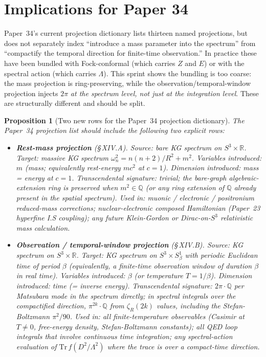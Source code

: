 \documentclass[11pt]{article}
\newtheorem{proposition}{Proposition}
\begin{document}
\section{Implications for Paper 34}
\label{sec:paper34}

Paper~34's current projection dictionary lists thirteen named
projections, but does not separately index ``introduce a mass parameter
into the spectrum'' from ``compactify the temporal direction for
finite-time observation.''  In practice these have been bundled with
Fock-conformal (which carries $Z$ and $E$) or with the spectral action
(which carries $\Lambda$).  This sprint shows the bundling is too
coarse: the mass projection is ring-preserving, while the
observation/temporal-window projection injects $2\pi$ \emph{at the
spectrum level, not just at the integration level}.  These are
structurally different and should be split.

\begin{proposition}[Two new rows for the Paper~34 projection dictionary]
\label{prop:two_rows}
The Paper~34 projection list should include the following two
explicit rows:

\begin{itemize}
\setlength\itemsep{0pt}
\item \textbf{Rest-mass projection} (\S\,XIV.A).
\textit{Source:} bare KG spectrum on $S^3 \times \mathbb{R}$.
\textit{Target:} massive KG spectrum
$\omega_n^2 = n(n+2)/R^2 + m^2$.
\textit{Variables introduced:} $m$ (mass; equivalently rest-energy
$mc^2$ at $c=1$).
\textit{Dimension introduced:} mass = energy at $c = 1$.
\textit{Transcendental signature:} \emph{trivial}; the bare-graph
algebraic-extension ring is preserved when $m^2 \in \mathbb{Q}$ (or any
ring extension of $\mathbb{Q}$ already present in the spatial
spectrum).
\textit{Used in:} muonic / electronic / positronium reduced-mass
corrections; nuclear-electronic composed Hamiltonian (Paper~23
hyperfine I.S coupling); any future Klein-Gordon or Dirac-on-$S^3$
relativistic mass calculation.

\item \textbf{Observation / temporal-window projection} (\S\,XIV.B).
\textit{Source:} KG spectrum on $S^3 \times \mathbb{R}$.
\textit{Target:} KG spectrum on $S^3 \times S^1_\beta$ with periodic
Euclidean time of period $\beta$ (equivalently, a finite-time
observation window of duration $\beta$ in real time).
\textit{Variables introduced:} $\beta$ (or temperature $T = 1/\beta$).
\textit{Dimension introduced:} time (= inverse energy).
\textit{Transcendental signature:} $2\pi \cdot \mathbb{Q}$ per
Matsubara mode in the spectrum directly; in spectral integrals over
the compactified direction, $\pi^{2k} \cdot \mathbb{Q}$ from
$\zeta_R(2k)$ values, including the Stefan-Boltzmann $\pi^2/90$.
\textit{Used in:} all finite-temperature observables (Casimir at
$T \neq 0$, free-energy density, Stefan-Boltzmann constants); all
QED loop integrals that involve continuous time integration; any
spectral-action evaluation of $\mathrm{Tr}\, f(D^2/\Lambda^2)$
where the trace is over a compact-time direction.
\end{itemize}
\end{proposition}
\end{document}
